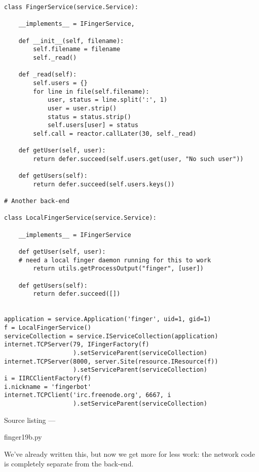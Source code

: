 \begin{verbatim}
class FingerService(service.Service):

    __implements__ = IFingerService,

    def __init__(self, filename):
        self.filename = filename
        self._read()

    def _read(self):
        self.users = {}
        for line in file(self.filename):
            user, status = line.split(':', 1)
            user = user.strip()
            status = status.strip()
            self.users[user] = status
        self.call = reactor.callLater(30, self._read)

    def getUser(self, user):
        return defer.succeed(self.users.get(user, "No such user"))

    def getUsers(self):
        return defer.succeed(self.users.keys())

# Another back-end

class LocalFingerService(service.Service):

    __implements__ = IFingerService

    def getUser(self, user):
    # need a local finger daemon running for this to work
        return utils.getProcessOutput("finger", [user])

    def getUsers(self):
        return defer.succeed([])


application = service.Application('finger', uid=1, gid=1)
f = LocalFingerService()
serviceCollection = service.IServiceCollection(application)
internet.TCPServer(79, IFingerFactory(f)
                   ).setServiceParent(serviceCollection)
internet.TCPServer(8000, server.Site(resource.IResource(f))
                   ).setServiceParent(serviceCollection)
i = IIRCClientFactory(f)
i.nickname = 'fingerbot'
internet.TCPClient('irc.freenode.org', 6667, i
                   ).setServiceParent(serviceCollection)
\end{verbatim}\parbox[b]{\linewidth}{\begin{center}Source listing --- \begin{em}finger19b.py\end{em}\end{center}}

We've already written this, but now we get more for less work: the network code is completely separate from the back-end.

